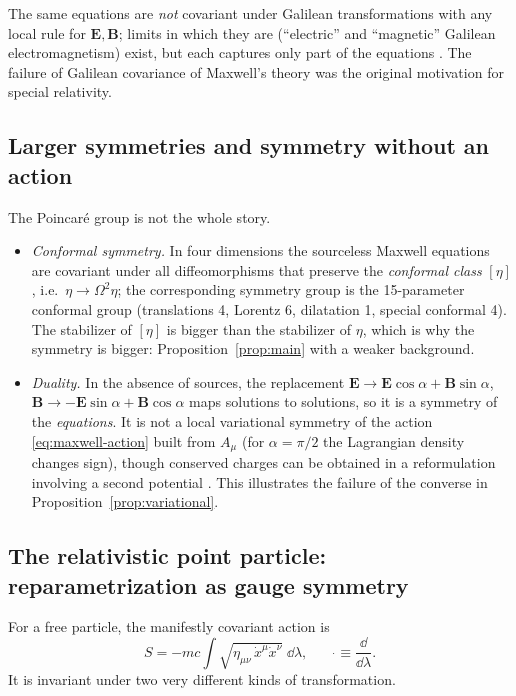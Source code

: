 The same equations are \emph{not} covariant under Galilean transformations
with any local rule for ${\bm{E}},{\bm{B}}$; limits in which they are (``electric'' and
``magnetic'' Galilean electromagnetism) exist, but each captures only part of
the equations \cite{lbll}. The failure of Galilean covariance of Maxwell's
theory was the original motivation for special relativity.

\subsection{Larger symmetries and symmetry without an action}

The Poincar\'e group is not the whole story.
\begin{itemize}[leftmargin=1.6em,itemsep=2pt]
\item \emph{Conformal symmetry.} In four dimensions the sourceless Maxwell
  equations are covariant under all diffeomorphisms that preserve the
  \emph{conformal class} $[\eta]$, i.e.\ $\eta\to\Omega^2\eta$; the
  corresponding symmetry group is the 15-parameter conformal group
  (translations 4, Lorentz 6, dilatation 1, special conformal 4). The
  stabilizer of $[\eta]$ is bigger than the stabilizer of $\eta$, which is why
  the symmetry is bigger: Proposition~\ref{prop:main} with a weaker background.
\item \emph{Duality.} In the absence of sources, the replacement
  ${\bm{E}}\to{\bm{E}}\cos\alpha+{\bm{B}}\sin\alpha$, ${\bm{B}}\to-{\bm{E}}\sin\alpha+{\bm{B}}\cos\alpha$
  maps solutions to solutions, so it is a symmetry of the \emph{equations}.
  It is not a local variational symmetry of the action \eqref{eq:maxwell-action}
  built from $A_\mu$ (for $\alpha=\pi/2$ the Lagrangian density changes sign),
  though conserved charges can be obtained in a reformulation involving a
  second potential \cite{deser}. This illustrates the failure of the converse
  in Proposition~\ref{prop:variational}.
\end{itemize}

\subsection{The relativistic point particle: reparametrization as gauge symmetry}

For a free particle, the manifestly covariant action is
\begin{equation}\label{eq:particle}
  S=-mc\int\sqrt{\eta_{\mu\nu}\,\dot x^\mu\dot x^\nu}\;\dd\lambda ,
  \qquad \dot{}\equiv\frac{\dd}{\dd\lambda}.
\end{equation}
It is invariant under two very different kinds of transformation.

